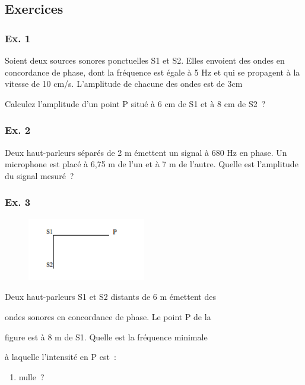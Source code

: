 {\subsection{Exercices}

\subsubsection{Ex. 1}

Soient deux sources sonores ponctuelles S1 et S2. Elles envoient des
ondes en concordance de phase, dont la fréquence est égale à 5 Hz et qui
se propagent à la vitesse de 10 cm/s. L'amplitude de chacune des ondes
est de 3cm

Calculez l'amplitude d'un point P situé à 6 cm de S1 et à 8 cm de S2~?

\subsubsection{Ex. 2}

Deux haut-parleurs séparés de 2 m émettent un signal à 680 Hz en phase.
Un microphone est placé à 6,75 m de l'un et à 7 m de l'autre. Quelle est
l'amplitude du signal mesuré~?

\subsubsection{Ex. 3}

\begin{figure}
\centering
\includegraphics[width=5.151cm,height=2.729cm]{Pictures/10000001000000BC000000630AF71C86AA2A0A65.png}
\caption{}
\end{figure}

Deux haut-parleurs S1 et S2 distants de 6 m émettent des

ondes sonores en concordance de phase. Le point P de la

figure est à 8 m de S1. Quelle est la fréquence minimale

à laquelle l'intensité en P est~:

\begin{enumerate}
\def\labelenumi{\alph{enumi})}
\tightlist
\item
  nulle~?
\end{enumerate}

}
